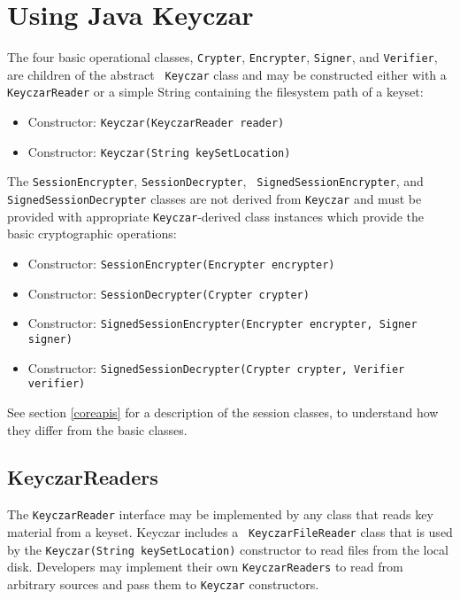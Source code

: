 \documentclass{llncs}
\begin{document}
\section{Using Java Keyczar}

The four basic operational classes, {\tt Crypter}, {\tt Encrypter},
{\tt Signer}, and {\tt Verifier}, are children of the abstract {\tt
  Keyczar} class and may be constructed either with a {\tt
  KeyczarReader} or a simple String containing the filesystem path of
a keyset:

\begin{itemize}
  \item Constructor: {\tt Keyczar(KeyczarReader reader)}
  \item Constructor: {\tt Keyczar(String keySetLocation)}
\end{itemize}

The {\tt SessionEncrypter}, {\tt SessionDecrypter}, {\tt
  SignedSessionEncrypter}, and {\tt SignedSessionDecrypter} classes
are not derived from {\tt Keyczar} and must be provided with
appropriate {\tt Keyczar}-derived class instances which provide the
basic cryptographic operations:

\begin{itemize}
  \item Constructor: {\tt SessionEncrypter(Encrypter encrypter)}
  \item Constructor: {\tt SessionDecrypter(Crypter crypter)}
  \item Constructor: {\tt SignedSessionEncrypter(Encrypter encrypter,
    Signer signer)}
  \item Constructor: {\tt SignedSessionDecrypter(Crypter crypter,
    Verifier verifier)}
\end{itemize}

See section \ref{coreapis} for a description of the session classes,
to understand how they differ from the basic classes.

\subsection{KeyczarReaders}

The {\tt KeyczarReader} interface may be implemented by any class that
reads key material from a keyset. Keyczar includes a {\tt
  KeyczarFileReader} class that is used by the {\tt Keyczar(String
  keySetLocation)} constructor to read files from the local
disk. Developers may implement their own {\tt KeyczarReaders} to read
from arbitrary sources and pass them to {\tt Keyczar} constructors.
\end{document}
